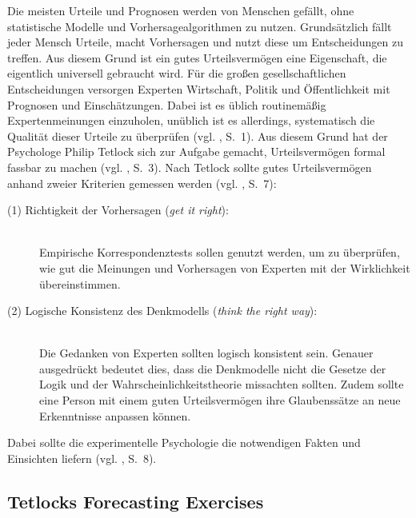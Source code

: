 Die meisten Urteile und Prognosen werden von Menschen gefällt, ohne statistische
Modelle und Vorhersagealgorithmen zu nutzen. Grundsätzlich fällt jeder Mensch
Urteile, macht Vorhersagen und nutzt diese um Entscheidungen zu treffen. Aus
diesem Grund ist ein gutes Urteilsvermögen eine Eigenschaft, die eigentlich
universell gebraucht wird. Für die großen gesellschaftlichen Entscheidungen
versorgen Experten Wirtschaft, Politik und Öffentlichkeit mit Prognosen und
Einschätzungen. Dabei ist es üblich routinemäßig Expertenmeinungen einzuholen,
unüblich ist es allerdings, systematisch die Qualität dieser Urteile zu
überprüfen (vgl. \cite{Tetlock}, S.~1). Aus diesem Grund hat der Psychologe
Philip Tetlock sich zur Aufgabe gemacht,  Urteilsvermögen\grqq
formal fassbar zu machen (vgl. \cite{Tetlock}, S.~3). Nach Tetlock sollte gutes
Urteilsvermögen anhand zweier Kriterien gemessen werden (vgl. \cite{Tetlock},
S.~7):
\begin{description}
\item[(1) Richtigkeit der Vorhersagen (\emph{get it right}):] \hfill \\
\label{misc:Emp_Korr}
Empirische Korrespondenztests sollen genutzt werden, um zu überprüfen, wie gut
die Meinungen und Vorhersagen von Experten mit der Wirklichkeit übereinstimmen.
\item[(2) Logische Konsistenz des Denkmodells (\emph{think the right way}):] \hfill \\
Die Gedanken von Experten sollten logisch konsistent sein. Genauer ausgedrückt
bedeutet dies, dass die Denkmodelle nicht die Gesetze der Logik und der
Wahrscheinlichkeitstheorie missachten sollten. Zudem sollte eine Person mit
einem guten Urteilsvermögen ihre Glaubenssätze an neue Erkenntnisse anpassen
können.
\end{description}
Dabei sollte die experimentelle Psychologie die notwendigen Fakten und
Einsichten liefern (vgl. \cite{Tetlock}, S.~8).

\subsection{Tetlocks Forecasting Exercises}

